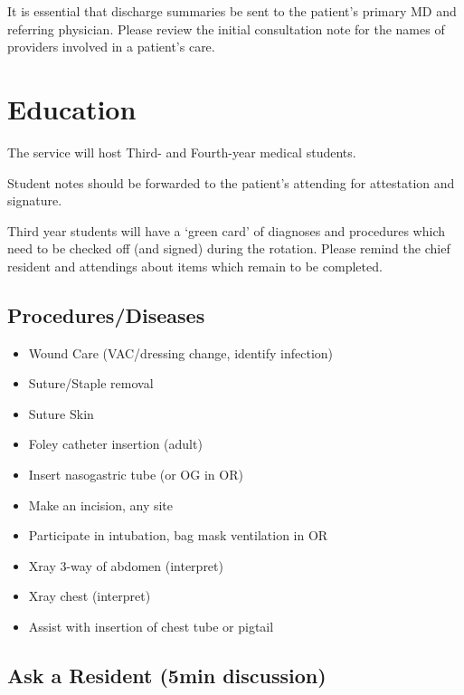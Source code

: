 \documentclass[
]{book}
\providecommand{\tightlist}{%
  \setlength{\itemsep}{0pt}\setlength{\parskip}{0pt}}
\begin{document}
It is essential that discharge summaries be sent to the patient's primary MD and referring physician. Please review the initial consultation note for the names of providers involved in a patient's care.

\hypertarget{education}{%
\chapter{Education}\label{education}}

The service will host Third- and Fourth-year medical students.

Student notes should be forwarded to the patient's attending for attestation and signature.

Third year students will have a `green card' of diagnoses and procedures which need to be checked off (and signed) during the rotation. Please remind the chief resident and attendings about items which remain to be completed.

\hypertarget{proceduresdiseases}{%
\section{Procedures/Diseases}\label{proceduresdiseases}}

\begin{itemize}
\tightlist
\item
  Wound Care (VAC/dressing change, identify infection)
\item
  Suture/Staple removal
\item
  Suture Skin
\item
  Foley catheter insertion (adult)
\item
  Insert nasogastric tube (or OG in OR)
\item
  Make an incision, any site
\item
  Participate in intubation, bag mask ventilation in OR
\item
  Xray 3-way of abdomen (interpret)
\item
  Xray chest (interpret)
\item
  Assist with insertion of chest tube or pigtail
\end{itemize}

\hypertarget{ask-a-resident-5min-discussion}{%
\section{Ask a Resident (5min discussion)}\label{ask-a-resident-5min-discussion}}
\end{document}
